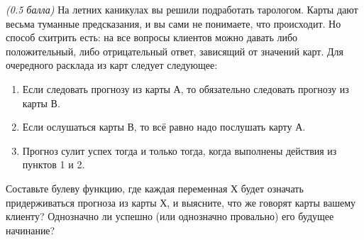 \question
\textit{(0.5 балла)} На летних каникулах вы решили подработать тарологом. Карты дают весьма туманные предсказания, и вы сами не понимаете, что происходит. Но способ схитрить есть: на все вопросы клиентов можно давать либо положительный, либо отрицательный ответ, зависящий от значений карт. Для очередного расклада из карт следует следующее:

\begin{enumerate}
\item Если следовать прогнозу из карты А, то обязательно следовать прогнозу из карты В.
\item Если ослушаться карты В, то всё равно надо послушать карту А.
\item Прогноз сулит успех тогда и только тогда, когда выполнены действия из пунктов 1 и 2.
\end{enumerate}

Составьте булеву функцию, где каждая переменная Х будет означать \flqq придерживаться прогноза из карты Х\frqq, и выясните, что же говорят карты вашему клиенту? Однозначно ли успешно (или однозначно провально) его будущее начинание?